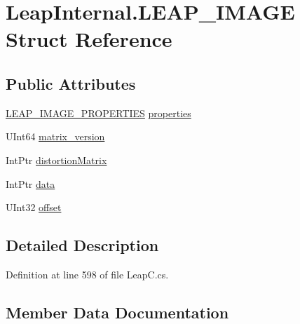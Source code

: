 \hypertarget{struct_leap_internal_1_1_l_e_a_p___i_m_a_g_e}{}\section{Leap\+Internal.\+L\+E\+A\+P\+\_\+\+I\+M\+A\+GE Struct Reference}
\label{struct_leap_internal_1_1_l_e_a_p___i_m_a_g_e}
\subsection*{Public Attributes}
\begin{DoxyCompactItemize}
\item 
\mbox{\hyperlink{struct_leap_internal_1_1_l_e_a_p___i_m_a_g_e___p_r_o_p_e_r_t_i_e_s}{L\+E\+A\+P\+\_\+\+I\+M\+A\+G\+E\+\_\+\+P\+R\+O\+P\+E\+R\+T\+I\+ES}} \mbox{\hyperlink{struct_leap_internal_1_1_l_e_a_p___i_m_a_g_e_a3b83f7ce1ccf101f5db8dc4b69c4f7d5}{properties}}
\item 
U\+Int64 \mbox{\hyperlink{struct_leap_internal_1_1_l_e_a_p___i_m_a_g_e_a08b36eb333ef921115bcb8ca372f5f82}{matrix\+\_\+version}}
\item 
Int\+Ptr \mbox{\hyperlink{struct_leap_internal_1_1_l_e_a_p___i_m_a_g_e_aacb2b4960c7c299e6bfcdddde81e2bba}{distortion\+Matrix}}
\item 
Int\+Ptr \mbox{\hyperlink{struct_leap_internal_1_1_l_e_a_p___i_m_a_g_e_a9df0089a280651ae8a80ecb5275c8a65}{data}}
\item 
U\+Int32 \mbox{\hyperlink{struct_leap_internal_1_1_l_e_a_p___i_m_a_g_e_a25017e8a70c7617e9c61437c1626f6ff}{offset}}
\end{DoxyCompactItemize}


\subsection{Detailed Description}


Definition at line 598 of file Leap\+C.\+cs.



\subsection{Member Data Documentation}
\mbox{\label{struct_leap_internal_1_1_l_e_a_p___i_m_a_g_e_a9df0089a280651ae8a80ecb5275c8a65}} 
